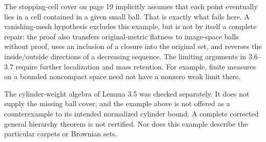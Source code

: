 \documentclass[10pt]{article}
\begin{document}
The stopping-cell cover on page 19 implicitly assumes that each point eventually lies in a cell contained in a given small ball. That is exactly what fails here. A vanishing-mesh hypothesis excludes this example, but is not by itself a complete repair: the proof also transfers original-metric flatness to image-space balls without proof, uses an inclusion of a closure into the original set, and reverses the inside/outside directions of a decreasing sequence. The limiting arguments in 3.6–3.7 require further localization and mass retention. For example, finite measures on a bounded noncompact space need not have a nonzero weak limit there.\par
The cylinder-weight algebra of Lemma 3.5 was checked separately. It does not supply the missing ball cover, and the example above is not offered as a counterexample to its intended normalized cylinder bound. A complete corrected general hierarchy theorem is not certified. Nor does this example describe the particular carpets or Brownian sets.\par
\end{document}

